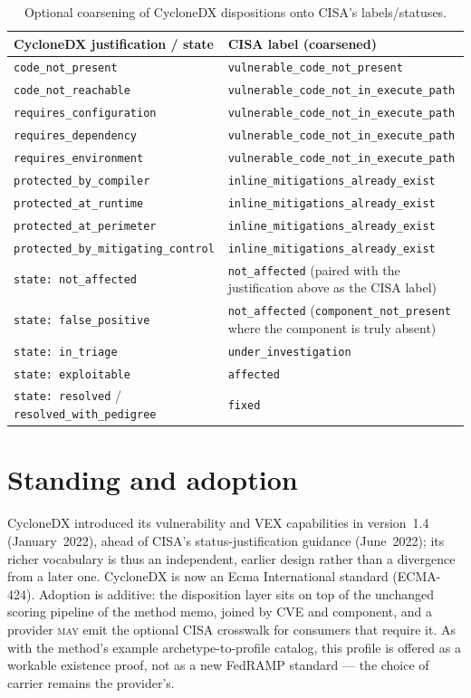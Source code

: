 \documentclass[11pt]{article}
\newcommand{\code}[1]{\texttt{#1}}
\newcommand{\rfckw}[1]{\textsc{#1}}
\begin{document}
\begin{table}[H]
\centering
\footnotesize
\renewcommand{\arraystretch}{1.15}
\begin{tabular}{>{\raggedright\arraybackslash}p{} >{\raggedright\arraybackslash}p{}}
\toprule
\textbf{CycloneDX justification / state} & \textbf{CISA label (coarsened)} \\
\midrule
\code{code\_not\_present} & \code{vulnerable\_code\_not\_present} \\
\code{code\_not\_reachable} & \code{vulnerable\_code\_not\_in\_execute\_path} \\
\code{requires\_configuration} & \code{vulnerable\_code\_not\_in\_execute\_path} \\
\code{requires\_dependency} & \code{vulnerable\_code\_not\_in\_execute\_path} \\
\code{requires\_environment} & \code{vulnerable\_code\_not\_in\_execute\_path} \\
\code{protected\_by\_compiler} & \code{inline\_mitigations\_already\_exist} \\
\code{protected\_at\_runtime} & \code{inline\_mitigations\_already\_exist} \\
\code{protected\_at\_perimeter} & \code{inline\_mitigations\_already\_exist} \\
\code{protected\_by\_mitigating\_control} & \code{inline\_mitigations\_already\_exist} \\
\midrule
\code{state: not\_affected} & \code{not\_affected} (paired with the justification above as the CISA label) \\
\code{state: false\_positive} & \code{not\_affected} (\code{component\_not\_present} where the component is truly absent) \\
\code{state: in\_triage} & \code{under\_investigation} \\
\code{state: exploitable} & \code{affected} \\
\code{state: resolved} / \code{resolved\_with\_pedigree} & \code{fixed} \\
\bottomrule
\end{tabular}
\caption{Optional coarsening of CycloneDX dispositions onto CISA's labels/statuses.}
\end{table}

\section{Standing and adoption}
CycloneDX introduced its vulnerability and VEX capabilities in version~1.4
(January~2022), ahead of CISA's status-justification guidance (June~2022); its richer
vocabulary is thus an independent, earlier design rather than a divergence from a later
one. CycloneDX is now an Ecma International standard (ECMA-424). Adoption is additive:
the disposition layer sits on top of the unchanged scoring pipeline of the method memo,
joined by CVE and component, and a provider \rfckw{may} emit the optional CISA crosswalk
for consumers that require it. As with the method's example archetype-to-profile
catalog, this profile is offered as a workable existence proof, not as a new
FedRAMP standard --- the choice of carrier remains the provider's.
\end{document}
